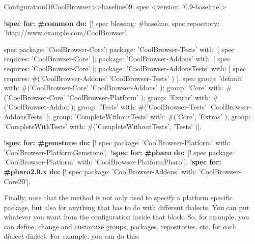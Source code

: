 \documentclass[a4paper,10pt,twoside]{book}
\begin{document}
\begin{code}{}
ConfigurationOfCoolBrowser>>baseline09: spec
      <version: '0.9-baseline'>

      !\textbf{spec for: \#common do: [}!
            spec blessing: #baseline.
            spec repository: 'http://www.example.com/CoolBrowser'.

            spec
                  package: 'CoolBrowser-Core';
                  package: 'CoolBrowser-Tests' with: [ spec requires: 'CoolBrowser-Core' ];
                  package: 'CoolBrowser-Addons' with: [ spec requires: 'CoolBrowser-Core' ];
                  package: 'CoolBrowser-AddonsTests' with: [
                        spec requires: #('CoolBrowser-Addons' 'CoolBrowser-Tests' ) ].
            spec
                  group: 'default' with: #('CoolBrowser-Core' 'CoolBrowser-Addons' );
                  group: 'Core' with: #('CoolBrowser-Core' 'CoolBrowser-Platform' );
                  group: 'Extras' with: #('CoolBrowser-Addon');
                  group: 'Tests' with: #('CoolBrowser-Tests' 'CoolBrowser-AddonsTests' );
                  group: 'CompleteWithoutTests' with: #('Core', 'Extras' );
                  group: 'CompleteWithTests' with: #('CompleteWithoutTests', 'Tests' )].

      !\textbf{spec for: \#gemstone do: [}!
            spec package: 'CoolBrowser-Platform' with: 'CoolBrowser-PlatformGemstone'].
      !\textbf{spec for: \#pharo do: [}!
            spec package: 'CoolBrowser-Platform' with: 'CoolBrowser-PlatformPharo'].
      !\textbf{spec for: \#pharo2.0.x do: [}!
            spec package: 'CoolBrowser-Addons' with: 'CoolBrowser-Core20'].
\end{code}


Finally, note that the method  is not only used to specify a platform specific package, but also for anything that has to do with different dialects. You can put whatever you want from the configuration inside that block. So, for example, you can define, change and customize groups, packages, repositories, etc, for each dialect dialect. For example, you can do this:
\end{document}
